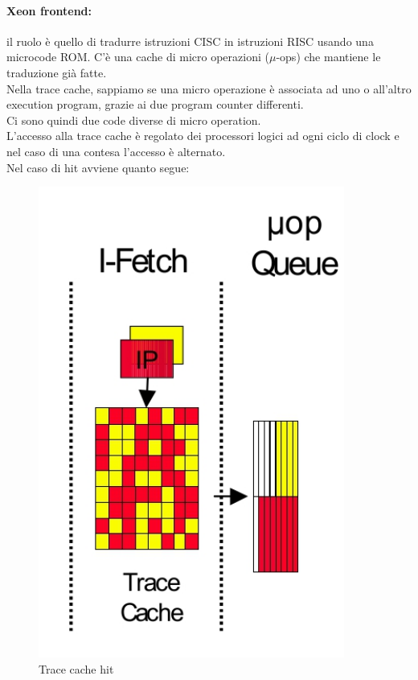 \documentclass[12pt, oneside]{extbook} %
\begin{document}
\paragraph{Xeon frontend:}il ruolo è quello di tradurre istruzioni CISC in istruzioni RISC usando una microcode ROM. C'è una cache di micro operazioni ($\mu$-ops) che mantiene le traduzione già fatte.\\ Nella trace cache, sappiamo se una micro operazione è associata ad uno o all'altro execution program, grazie ai due program counter differenti.\\Ci sono quindi due code diverse di micro operation.\\L'accesso alla trace cache è regolato dei processori logici ad ogni ciclo di clock e nel caso di una contesa l'accesso è alternato.\\Nel caso di hit avviene quanto segue:\\
\begin{figure}
	\includegraphics[scale=0.5]{immagini/trace_cache_hit.png}
	\caption{Trace cache hit}
\end{figure}
\\\\
\end{document}
